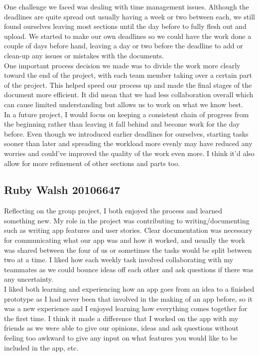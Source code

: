 One challenge we faced was dealing with time management issues. Although the deadlines are quite spread out usually having a week or two between each, we still found ourselves leaving most sections until the day before to fully flesh out and upload. We started to make our own deadlines so we could have the work done a couple of days before hand, leaving a day or two before the deadline to add or clean-up any issues or mistakes with the documents. \\

One important process decision we made was to divide the work more clearly toward the end of the project, with each team member taking over a certain part of the project. This helped speed our process up and made the final stages of the document more efficient. It did mean that we had less collaboration overall which can cause limited understanding but allows us to work on what we know best.\\

In a future project, I would focus on keeping a consistent chain of progress from the beginning rather than leaving it fall behind and become work for the day before. Even though we introduced earlier deadlines for ourselves, starting tasks sooner than later and spreading the workload more evenly may have reduced any worries and could've improved the quality of the work even more. I think it'd also allow for more refinement of other sections and parts too.\\

\subsection*{Ruby Walsh 20106647}
Reflecting on the group project, I both enjoyed the process and learned something new. My role in the project was contributing to writing/documenting such as writing app features and user stories. Clear documentation was necessary for communicating what our app was and how it worked, and usually the work was shared between the four of us or sometimes the tasks would be split between two at a time. I liked how each weekly task involved collaborating with my teammates as we could bounce ideas off each other and ask questions if there was any uncertainty.\\

I liked both learning and experiencing how an app goes from an idea to a finished prototype as I had never been that involved in the making of an app before, so it was a new experience and I enjoyed learning how everything comes together for the first time. I think it made a difference that I worked on the app with my friends as we were able to give our opinions, ideas and ask questions without feeling too awkward to give any input on what features you would like to be included in the app, etc.\\

